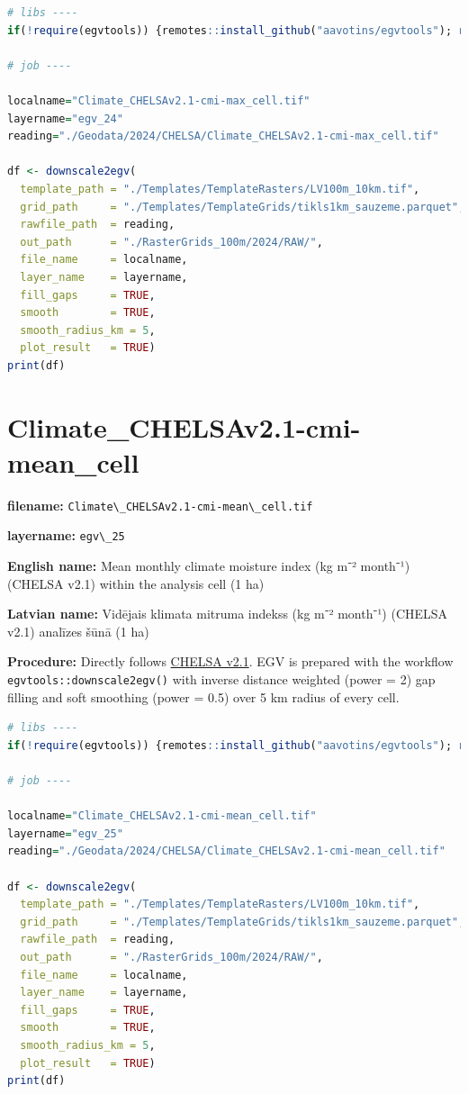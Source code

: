 \documentclass[
]{book}
\newcommand{\passthrough}[1]{#1}
\begin{document}
\begin{lstlisting}[language=R]
# libs ----
if(!require(egvtools)) {remotes::install_github("aavotins/egvtools"); require(egvtools)}

# job ----

localname="Climate_CHELSAv2.1-cmi-max_cell.tif"
layername="egv_24"
reading="./Geodata/2024/CHELSA/Climate_CHELSAv2.1-cmi-max_cell.tif"

df <- downscale2egv(
  template_path = "./Templates/TemplateRasters/LV100m_10km.tif",
  grid_path     = "./Templates/TemplateGrids/tikls1km_sauzeme.parquet",
  rawfile_path  = reading,
  out_path      = "./RasterGrids_100m/2024/RAW/",
  file_name     = localname,
  layer_name    = layername,
  fill_gaps     = TRUE,
  smooth        = TRUE,
  smooth_radius_km = 5,
  plot_result   = TRUE)
print(df)
\end{lstlisting}

\section{Climate\_CHELSAv2.1-cmi-mean\_cell}\label{ch06.025}

\textbf{filename:} \passthrough{\lstinline!Climate\_CHELSAv2.1-cmi-mean\_cell.tif!}

\textbf{layername:} \passthrough{\lstinline!egv\_25!}

\textbf{English name:} Mean monthly climate moisture index (kg m⁻² month⁻¹) (CHELSA v2.1) within the analysis cell (1 ha)

\textbf{Latvian name:} Vidējais klimata mitruma indekss (kg m⁻² month⁻¹) (CHELSA v2.1) analīzes šūnā (1 ha)

\textbf{Procedure:} Directly follows \hyperref[Ch04.11]{CHELSA v2.1}. EGV is prepared with the
workflow \passthrough{\lstinline!egvtools::downscale2egv()!} with inverse distance weighted (power = 2)
gap filling and soft smoothing (power = 0.5) over 5 km radius of every cell.

\begin{lstlisting}[language=R]
# libs ----
if(!require(egvtools)) {remotes::install_github("aavotins/egvtools"); require(egvtools)}

# job ----

localname="Climate_CHELSAv2.1-cmi-mean_cell.tif"
layername="egv_25"
reading="./Geodata/2024/CHELSA/Climate_CHELSAv2.1-cmi-mean_cell.tif"

df <- downscale2egv(
  template_path = "./Templates/TemplateRasters/LV100m_10km.tif",
  grid_path     = "./Templates/TemplateGrids/tikls1km_sauzeme.parquet",
  rawfile_path  = reading,
  out_path      = "./RasterGrids_100m/2024/RAW/",
  file_name     = localname,
  layer_name    = layername,
  fill_gaps     = TRUE,
  smooth        = TRUE,
  smooth_radius_km = 5,
  plot_result   = TRUE)
print(df)
\end{lstlisting}
\end{document}
